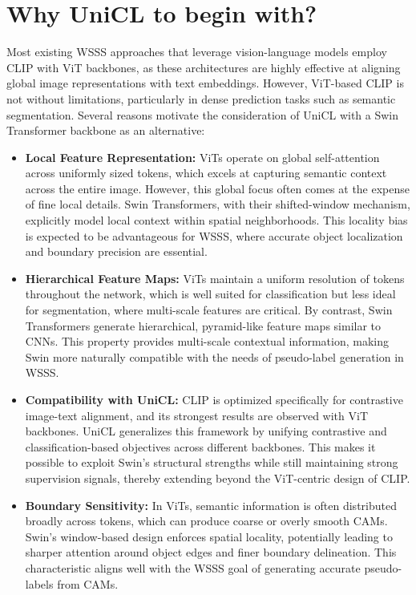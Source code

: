 \section{Why UniCL to begin with?}
\label{sec:why_unicl}

Most existing WSSS approaches that leverage vision-language models employ CLIP with ViT backbones, as these architectures are highly effective at aligning global image representations with text embeddings. However, ViT-based CLIP is not without limitations, particularly in dense prediction tasks such as semantic segmentation. Several reasons motivate the consideration of UniCL with a Swin Transformer backbone as an alternative:

\begin{itemize}
    \item \textbf{Local Feature Representation:}  
    ViTs operate on global self-attention across uniformly sized tokens, which excels at capturing semantic context across the entire image. However, this global focus often comes at the expense of fine local details. Swin Transformers, with their shifted-window mechanism, explicitly model local context within spatial neighborhoods. This locality bias is expected to be advantageous for WSSS, where accurate object localization and boundary precision are essential.

    \item \textbf{Hierarchical Feature Maps:}  
    ViTs maintain a uniform resolution of tokens throughout the network, which is well suited for classification but less ideal for segmentation, where multi-scale features are critical. By contrast, Swin Transformers generate hierarchical, pyramid-like feature maps similar to CNNs. This property provides multi-scale contextual information, making Swin more naturally compatible with the needs of pseudo-label generation in WSSS.

    \item \textbf{Compatibility with UniCL:}  
CLIP is optimized specifically for contrastive image-text alignment, and its strongest results are observed with ViT backbones. UniCL generalizes this framework by unifying contrastive and classification-based objectives across different backbones. This makes it possible to exploit Swin's structural strengths while still maintaining strong supervision signals, thereby extending beyond the ViT-centric design of CLIP.

    \item \textbf{Boundary Sensitivity:}  
    In ViTs, semantic information is often distributed broadly across tokens, which can produce coarse or overly smooth CAMs. Swin's window-based design enforces spatial locality, potentially leading to sharper attention around object edges and finer boundary delineation. This characteristic aligns well with the WSSS goal of generating accurate pseudo-labels from CAMs.


\end{itemize}
